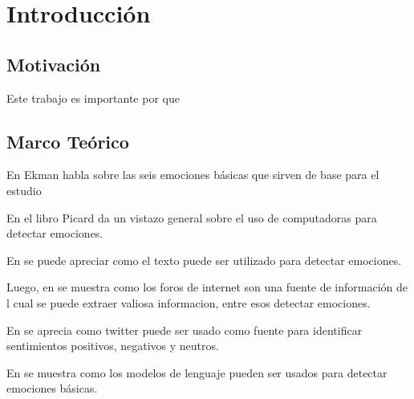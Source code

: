 \chapter{Introducción}






\section{Motivación}

Este trabajo es importante por que 



\section{Marco Teórico}

En \cite{ekman1993facial} Ekman habla sobre las seis emociones básicas que sirven de base para el estudio

En el libro \cite{picard2000affective} Picard da un vistazo general sobre el uso de computadoras para detectar emociones.

En \cite{alm2005emotions} se puede apreciar como el texto puede ser utilizado para detectar emociones.

Luego, en \cite{pang2008opinion} se muestra como los foros de internet son una fuente de información de l cual se puede extraer valiosa informacion, entre esos detectar emociones.

En \cite{pak2010twitter} se aprecia como twitter puede ser usado como fuente para identificar sentimientos positivos, negativos y neutros.

En \cite{roberts2012empatweet} se muestra como los modelos de lenguaje pueden ser usados para detectar emociones básicas.

